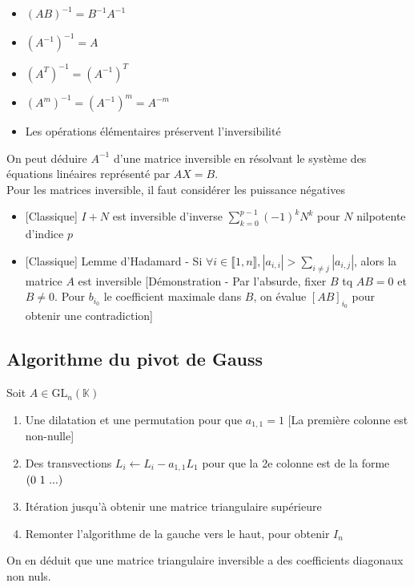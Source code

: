 \documentclass[openany]{book}
\begin{document}
\begin{itemize}
    \item $ (AB)^{-1} = B^{-1}A^{-1} $
    \item $ (A^{-1})^{-1} = A $
    \item $ (A^T)^{-1} = (A^{-1})^T $
    \item $ (A^m)^{-1} = (A^{-1})^m = A^{-m} $
    \item Les opérations élémentaires préservent l'inversibilité
\end{itemize}

\noindent On peut déduire $A^{-1}$ d'une matrice inversible en résolvant le système des équations linéaires représenté par $AX=B$. \\

\noindent Pour les matrices inversible, il faut considérer les puissance négatives 

\begin{itemize}
    \item{} [Classique] $I + N$ est inversible d'inverse $\sum_{k=0}^{p-1} (-1)^kN^k$ pour $N$ nilpotente d'indice $p$
    \item{} [Classique] Lemme d'Hadamard - Si $\forall i \in \llbracket 1, n \rrbracket, |a_{i, i}| > \sum_{i \neq j} |a_{i, j}|$, alors la matrice $A$ est inversible [Démonstration - Par l'absurde, fixer $B$ tq $AB = 0$ et $B \neq 0$. Pour $b_{i_0}$ le coefficient maximale dans $B$, on évalue $[AB]_{i_0}$ pour obtenir une contradiction]
\end{itemize}

\subsection{Algorithme du pivot de Gauss}
Soit $A \in \text{GL}_n(\mathbb{K})$
\begin{enumerate}
    \item Une dilatation et une permutation pour que $a_{1, 1} = 1$ [La première colonne est non-nulle]
    \item Des transvections $ L_i \leftarrow L_i - a_{1, 1}L_1 $ pour que la 2e colonne est de la forme $(0 \text{ } 1 \text{ } ...) $
    \item Itération jusqu'à obtenir une matrice triangulaire supérieure
    \item Remonter l'algorithme de la gauche vers le haut, pour obtenir $I_n$
\end{enumerate}

\noindent On en déduit que une matrice triangulaire inversible a des coefficients diagonaux non nuls.
\end{document}
